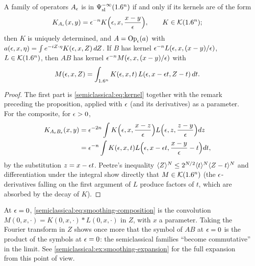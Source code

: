 \begin{proposition}\label{semiclassical:prop:smoothing-kernels}
  A family of operators $A_\epsilon$ is in $\Psi^{-\infty}_{\mathrm{sl}}(1.6^n)$ if and only
  if its kernels are of the form
  \begin{equation}\label{semiclassical:eq:smoothing-kernel}
    K_{A_\epsilon}(x,y)=\epsilon^{-n}K\Bigl(\epsilon,x,\frac{x-y}{\epsilon}\Bigr),\qquad K\in\mathcal K(1.6^n);
  \end{equation}
  then $K$ is uniquely determined, and $A=\operatorname{Op}_\epsilon(a)$ with
  $a(\epsilon,x,\eta)=\int e^{-iZ\cdot\eta}K(\epsilon,x,Z)\,dZ$. If $B$ has kernel
  $\epsilon^{-n}L(\epsilon,x,(x-y)/\epsilon)$, $L\in\mathcal K(1.6^n)$, then $AB$ has kernel
  $\epsilon^{-n}M(\epsilon,x,(x-y)/\epsilon)$ with
  \begin{equation}\label{semiclassical:eq:smoothing-composition}
    M(\epsilon,x,Z)=\int_{1.6^n}K(\epsilon,x,t)\,L(\epsilon,x-\epsilon t,Z-t)\,dt .
  \end{equation}
\end{proposition}
\begin{proof}
  The first part is \eqref{semiclassical:eq:kernel} together with the remark
  preceding the proposition, applied with $\epsilon$ (and its derivatives) as a
  parameter. For the composite, for $\epsilon>0$,
  \begin{align*}
    K_{A_\epsilon B_\epsilon}(x,y)&=\epsilon^{-2n}\int K\Bigl(\epsilon,x,\frac{x-z}{\epsilon}\Bigr)L\Bigl(\epsilon,z,\frac{z-y}{\epsilon}\Bigr)dz\\
    &=\epsilon^{-n}\int K(\epsilon,x,t)L\Bigl(\epsilon,x-\epsilon t,\frac{x-y}{\epsilon}-t\Bigr)dt,
  \end{align*}
  by the substitution $z=x-\epsilon t$. Peetre's inequality
  $\langle Z\rangle^N\le2^{N/2}\langle t\rangle^N\langle Z-t\rangle^N$ and differentiation under the integral
  show directly that $M\in\mathcal K(1.6^n)$ (the $\epsilon$-derivatives falling on the
  first argument of $L$ produce factors of $t$, which are absorbed by the decay of
  $K$).
\end{proof}

At $\epsilon=0$, \eqref{semiclassical:eq:smoothing-composition} is the convolution
$M(0,x,\cdot)=K(0,x,\cdot)*L(0,x,\cdot)$ in $Z$, with $x$ a parameter. Taking the
Fourier transform in $Z$ shows once more that the symbol of $AB$ at $\epsilon=0$ is
the product of the symbols at $\epsilon=0$: the semiclassical families
``become commutative'' in the limit. See \cref{semiclassical:ex:smoothing-expansion}
for the full expansion from this point of view.


